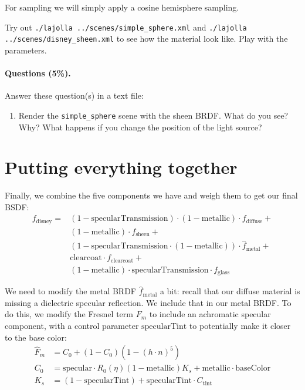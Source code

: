 For sampling we will simply apply a cosine hemisphere sampling.

Try out \lstinline{./lajolla ../scenes/simple_sphere.xml} and \lstinline{./lajolla ../scenes/disney_sheen.xml} to see how the material look like. Play with the parameters.

\paragraph{Questions (5\%).} Answer these question(s) in a text file:
\begin{enumerate}
	\item Render the \lstinline{simple_sphere} scene with the sheen BRDF. What do you see? Why? What happens if you change the position of the light source?
\end{enumerate}

\section{Putting everything together}
Finally, we combine the five components we have and weigh them to get our final BSDF:
\begin{equation}
\begin{aligned}
f_{\text{disney}} =& (1 - \text{specularTransmission}) \cdot (1 - \text{metallic}) \cdot f_{\text{diffuse}} + \\
                   & (1 - \text{metallic}) \cdot f_{\text{sheen}} + \\
                   & (1 - \text{specularTransmission} \cdot (1 - \text{metallic})) \cdot \hat{f}_{\text{metal}} + \\
                   & \text{clearcoat} \cdot f_{\text{clearcoat}} + \\
                   & (1 - \text{metallic}) \cdot \text{specularTransmission} \cdot f_{\text{glass}}
\end{aligned}
\label{eq:disney_bsdf}
\end{equation}

We need to modify the metal BRDF $\hat{f}_{\text{metal}}$ a bit: recall that our diffuse material is missing
a dielectric specular reflection. We include that in our metal BRDF. To do this, we modify the Fresnel term $F_m$ to include an achromatic specular component, with a control parameter $\text{specularTint}$ to potentially make it closer to the base color:
\begin{equation}
\begin{aligned}
	\hat{F}_m &= C_0 + (1 - C_0) (1 - \left(h \cdot n\right)^5) \\
	C_0 &= \text{specular} \cdot R_0(\eta) (1 - \text{metallic}) K_s + \text{metallic} \cdot \text{baseColor} \\
	K_s &= (1 - \text{specularTint}) + \text{specularTint} \cdot C_{\text{tint}}
\end{aligned}
\end{equation}


